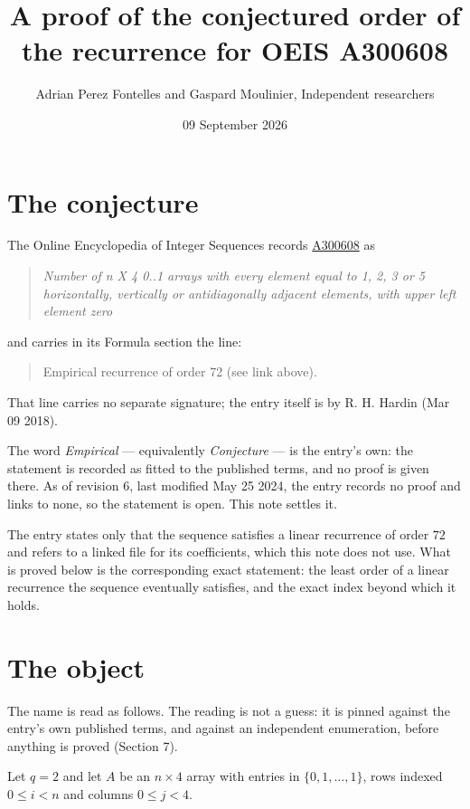 \documentclass[11pt]{article}
\title{A proof of the conjectured order of the recurrence for OEIS A300608}
\author{Adrian Perez Fontelles and Gaspard Moulinier, Independent researchers}
\date{09 September 2026}
\theoremstyle{definition}
\begin{document}
\maketitle
\section{The conjecture}

The Online Encyclopedia of Integer Sequences records \href{https://oeis.org/A300608}{A300608} as

\begin{quote}\itshape Number of n X 4 0..1 arrays with every element equal to 1, 2, 3 or 5 horizontally, vertically or antidiagonally adjacent elements, with upper left element zero\end{quote}

and carries in its Formula section the line:

\begin{quote}\ttfamily Empirical recurrence of order 72 (see link above).\end{quote}

That line carries no separate signature; the entry itself is by R. H. Hardin (Mar 09 2018).

The word {\itshape Empirical} --- equivalently {\itshape Conjecture} --- is the entry's own: the statement is recorded as fitted to the published terms, and no proof is given there. As of revision 6, last modified May 25 2024, the entry records no proof and links to none, so the statement is open. This note settles it.

The entry states only that the sequence satisfies a linear recurrence of order $72$ and refers to a linked file for its coefficients, which this note does not use. What is proved below is the corresponding exact statement: the least order of a linear recurrence the sequence eventually satisfies, and the exact index beyond which it holds.

\section{The object}

The name is read as follows. The reading is not a guess: it is pinned against the entry's own published terms, and against an independent enumeration, before anything is proved (Section 7).

Let $q = 2$ and let $A$ be an $n \times 4$ array with entries in $\{0,1,\dots,1\}$, rows indexed $0 \le i < n$ and columns $0 \le j < 4$.
\end{document}
